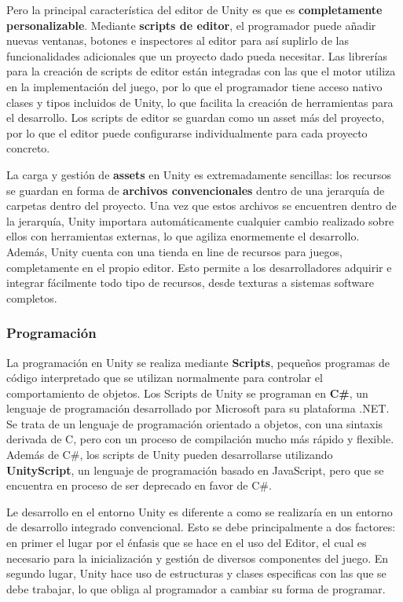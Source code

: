 Pero la principal característica del editor de Unity es que es \textbf{completamente personalizable}. Mediante \textbf{scripts de editor}, el programador puede añadir nuevas ventanas, botones e inspectores al editor para así suplirlo de las funcionalidades adicionales que un proyecto dado pueda necesitar. Las librerías para la creación de scripts de editor están integradas con las que el motor utiliza en la implementación del juego, por lo que el programador tiene acceso nativo clases y tipos incluidos de Unity, lo que facilita la creación de herramientas para el desarrollo. Los scripts de editor se guardan como un asset más del proyecto, por lo que el editor puede configurarse individualmente para cada proyecto concreto.

La carga y gestión de \textbf{assets} en Unity es extremadamente sencillas: los recursos se guardan en forma de \textbf{archivos convencionales} dentro de una jerarquía de carpetas dentro del proyecto. Una vez que estos archivos se encuentren dentro de la jerarquía, Unity importara automáticamente cualquier cambio realizado sobre ellos con herramientas externas, lo que agiliza enormemente el desarrollo. Además, Unity cuenta con una tienda en line de recursos para juegos, completamente en el propio editor. Esto permite a los desarrolladores adquirir e integrar fácilmente todo tipo de recursos, desde texturas a sistemas software completos. 

\subsubsection{Programación}
La programación en Unity se realiza mediante \textbf{Scripts}, pequeños programas de código interpretado que se utilizan normalmente para controlar el comportamiento de objetos. Los Scripts de Unity se programan en \textbf{C\#}, un lenguaje de programación desarrollado por Microsoft para su plataforma .NET. Se trata de un lenguaje de programación orientado a objetos, con una sintaxis derivada de C, pero con un proceso de compilación mucho más rápido y flexible. Además de C\#, los scripts de Unity pueden desarrollarse utilizando \textbf{UnityScript}, un lenguaje de programación basado en JavaScript, pero que se encuentra en proceso de ser deprecado en favor de C\#.

Le desarrollo en el entorno Unity es diferente a como se realizaría en un entorno de desarrollo integrado convencional. Esto se debe principalmente a dos factores: en primer el lugar por el énfasis que se hace en el uso del Editor, el cual es necesario para la inicialización y gestión de diversos componentes del juego. En segundo lugar, Unity hace uso de estructuras y clases especificas con las que se debe trabajar, lo que obliga al programador a cambiar su forma de programar.

